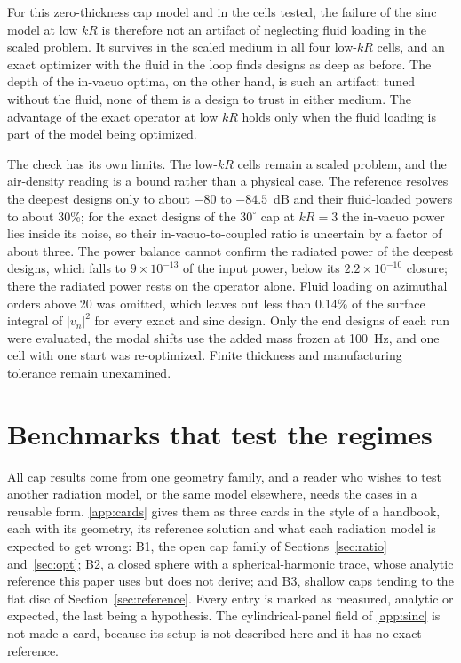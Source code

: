 \documentclass[preprint,12pt]{elsarticle}
\begin{document}
For this zero-thickness cap model and in the cells tested, the failure of the sinc model at low $kR$ is therefore not an artifact of neglecting fluid loading in the scaled problem. It survives in the scaled medium in all four low-$kR$ cells, and an exact optimizer with the fluid in the loop finds designs as deep as before. The depth of the in-vacuo optima, on the other hand, is such an artifact: tuned without the fluid, none of them is a design to trust in either medium. The advantage of the exact operator at low $kR$ holds only when the fluid loading is part of the model being optimized.

The check has its own limits. The low-$kR$ cells remain a scaled problem, and the air-density reading is a bound rather than a physical case. The reference resolves the deepest designs only to about $-80$ to $-84.5$~dB and their fluid-loaded powers to about 30\%; for the exact designs of the $30^\circ$ cap at $kR=3$ the in-vacuo power lies inside its noise, so their in-vacuo-to-coupled ratio is uncertain by a factor of about three. The power balance cannot confirm the radiated power of the deepest designs, which falls to $9\times10^{-13}$ of the input power, below its $2.2\times10^{-10}$ closure; there the radiated power rests on the operator alone. Fluid loading on azimuthal orders above 20 was omitted, which leaves out less than 0.14\% of the surface integral of $|v_n|^2$ for every exact and sinc design. Only the end designs of each run were evaluated, the modal shifts use the added mass frozen at 100~Hz, and one cell with one start was re-optimized. Finite thickness and manufacturing tolerance remain unexamined. %

\section{Benchmarks that test the regimes}
\label{sec:bench}
All cap results come from one geometry family, and a reader who wishes to test another radiation model, or the same model elsewhere, needs the cases in a reusable form. \ref{app:cards} gives them as three cards in the style of a handbook, each with its geometry, its reference solution and what each radiation model is expected to get wrong: B1, the open cap family of Sections~\ref{sec:ratio} and~\ref{sec:opt}; B2, a closed sphere with a spherical-harmonic trace, whose analytic reference this paper uses but does not derive; and B3, shallow caps tending to the flat disc of Section~\ref{sec:reference}. Every entry is marked as measured, analytic or expected, the last being a hypothesis. The cylindrical-panel field of \ref{app:sinc} is not made a card, because its setup is not described here and it has no exact reference.
\end{document}
